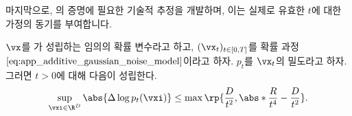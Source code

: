 \documentclass[../../book-main_ko.tex]{subfiles}
\begin{document}
마지막으로, 의 증명에 필요한 기술적 추정을 개발하며, 이는 실제로 유효한 \(t\)에 대한 가정의 동기를 부여합니다.

\begin{lemma}\label{lem:app_diffusion_laplacian_control}
    \(\vx\)를 가 성립하는 임의의 확률 변수라고 하고, \((\vx_{t})_{t \in [0, T]}\)를 확률 과정 \(\eqref{eq:app_additive_gaussian_noise_model}\)이라고 하자. \(p_{t}\)를 \(\vx_{t}\)의 밀도라고 하자. 그러면 \(t > 0\)에 대해 다음이 성립한다.
    \begin{equation}
        \sup_{\vxi \in \R^{D}}\abs{\Delta \log p_{t}(\vxi)} \leq \max\rp{\frac{D}{t^{2}}, \abs*{\frac{R}{t^{4}} - \frac{D}{t^{2}}}}.
    \end{equation}
\end{lemma}
\end{document}
